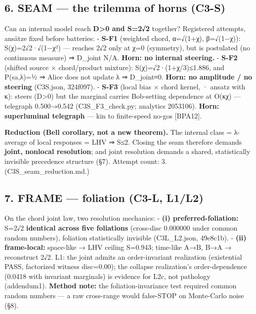 \documentclass[
  11pt]{article}
\begin{document}
\subsection{6. SEAM --- the trilemma of horns
(C3-S)}\label{seam-the-trilemma-of-horns-c3-s}

Can an internal model reach \textbf{D\textgreater0 and S=2√2} together?
Registered attempts, ansätze fixed before batteries: - \textbf{S-F1}
(weighted chord, α=√(1+χ), β=√(1−χ)): S(χ)=2√2·√(1−χ²) --- reaches 2√2
only at χ=0 (symmetry), but is postulated (no continuous measure) ⇒
D\_joint N/A. \textbf{Horn: no internal steering.} - \textbf{S-F2}
(shifted source × chord/product mixture): S(χ)=√2·(1+χ/3)≤1.886, and
P(s\textbar a,λ)=½ ⇒ Alice does not update λ ⇒ D\_joint≈0. \textbf{Horn:
no amplitude / no steering} (C3S.json, 324f097). - \textbf{S-F3} (local
bias × chord kernel, \textbar·\textbar{} ansatz with κ): steers
(D\textgreater0) but the marginal carries Bob-setting dependence at
O(κχ) --- telegraph 0.500→0.542 (C3S\_F3\_check.py; analytics 2053106).
\textbf{Horn: superluminal telegraph} --- kin to finite-speed no-gos
{[}BPA12{]}.

\textbf{Reduction (Bell corollary, not a new theorem).} The internal
class = λ-average of local responses = LHV ⇒ S≤2. Closing the seam
therefore demands \textbf{joint, nonlocal resolution}; and joint
resolution demands a shared, statistically invisible precedence
structure (§7). Attempt count: 3. (C3S\_seam\_reduction.md.)

\subsection{7. FRAME --- foliation (C3-L,
L1/L2)}\label{frame-foliation-c3-l-l1l2}

On the chord joint law, two resolution mechanics: - \textbf{(i)
preferred-foliation:} S=2√2 \textbf{identical across five foliations}
(cross-disc 0.000000 under common random numbers), foliation
statistically invisible (C3L\_L2.json, 49e8c1b). - \textbf{(ii)
frame-local:} space-like → LHV ceiling S=0.943; time-like A→B, B→A →
reconstruct 2√2. L1: the joint admits an order-invariant realization
(existential PASS, factorized witness disc=0.00); the collapse
realization's order-dependence (0.0418 with invariant marginals) is
evidence for L2c, not pathology (addendum1). \textbf{Method note:} the
foliation-invariance test required common random numbers --- a raw
cross-range would false-STOP on Monte-Carlo noise (§8).
\end{document}

